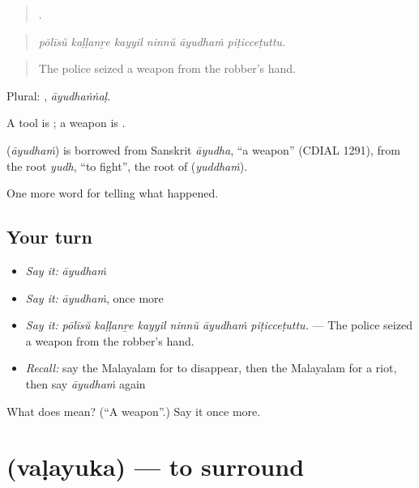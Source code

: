 \begin{quote}
     .
\end{quote}

\begin{quote}
\emph{pōlīsŭ kaḷḷanṟe kayyil ninnŭ āyudhaṁ piṭicceṭuttu.}
\end{quote}

\begin{quote}
The police seized a weapon from the robber's hand.
\end{quote}

Plural: , \emph{āyudhaṅṅaḷ}.

A tool is ; a weapon is .

\begin{cousinweb}
\textbf{} (\emph{āyudhaṁ}) is borrowed from Sanskrit \emph{āyudha}, \textquotedblleft{}a weapon\textquotedblright{} (CDIAL 1291), from the root \emph{yudh}, \textquotedblleft{}to fight\textquotedblright{}, the root of  (\emph{yuddhaṁ}).
\end{cousinweb}

\begin{grammarlens}[title={What you've built}]
One more word for telling what happened.
\end{grammarlens}

\subsection*{Your turn}
\begin{itemize}
\raggedright
  \item \emph{Say it:} \emph{āyudhaṁ}
  \item \emph{Say it:} \emph{āyudhaṁ}, once more
  \item \emph{Say it:} \emph{pōlīsŭ kaḷḷanṟe kayyil ninnŭ āyudhaṁ piṭicceṭuttu.} — The police seized a weapon from the robber's hand.
  \item \emph{Recall:} say the Malayalam for to disappear, then the Malayalam for a riot, then say \emph{āyudhaṁ} again
\end{itemize}

\begin{tcolorbox}[breakable,colback=teal!4,colframe=teal!35!black,title={Before you move on}]
What does  mean? (\textquotedblleft{}A weapon\textquotedblright{}.) Say it once more.
\end{tcolorbox}
\section[\texorpdfstring{\ml{വളയുക} (vaḷayuka)}{വളയുക (vaḷayuka)}]{ (vaḷayuka) — to surround}

